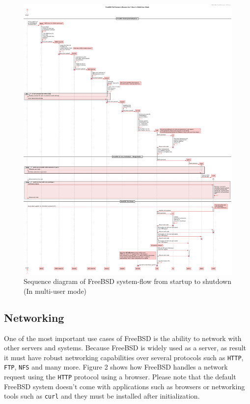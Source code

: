 \documentclass[12pt, dvipsnames, a4paper]{article}
\newcommand{\code}[1]{\texttt{#1}}
\begin{document}
\begin{figure}[!htb]
	\advance\leftskip-0.5cm
	\includegraphics[width = 570pt]{assets/sequence_diagrams/system-flow.pdf}
	\caption{Sequence diagram of FreeBSD system-flow from startup to shutdown (In multi-user mode) \cite{bootprocess}\cite{init}\cite{getty}\cite{login}}
\end{figure}
\clearpage

\subsection{Networking}
One of the most important use cases of FreeBSD is the ability to network with other servers and systems. Because FreeBSD is
widely used as a server, as result it must have robust networking capabilities over several protocols such as \code{HTTP}, \code{FTP}, \code{NFS} and many more.
Figure 2 shows how FreeBSD handles a network request using the \code{HTTP} protocol using a browser. Please note that the default FreeBSD system
doesn't come with applications such as browsers or networking tools such as \code{curl} and they must be installed after initialization.
\end{document}
